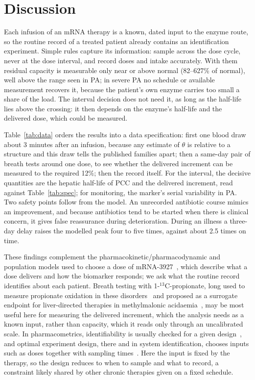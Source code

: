 \documentclass[11pt]{article}
\begin{document}
\section*{Discussion}

Each infusion of an mRNA therapy is a known, dated input to the enzyme route, so the routine
record of a treated patient already contains an identification experiment. Simple rules capture its information: sample across the dose
cycle, never at the dose interval, and record doses and intake accurately. With them residual
capacity is measurable only near or above normal (82--627\% of normal), well above the range seen
in PA; in severe PA no schedule or available measurement recovers it, because the patient's own
enzyme carries too small a share of the load. The interval decision does not need it, as long as
the half-life lies above the crossing: it then depends on the enzyme's half-life and the delivered
dose, which could be measured.

Table~\ref{tab:data} orders the results into a data specification: first one blood draw about 3
minutes after an infusion, because any estimate of $\theta$ is relative to a structure and this
draw tells the published families apart; then a same-day pair of breath tests around one dose, to
see whether the delivered increment can be measured to the required 12\%; then the record itself.
For the interval, the decisive quantities are the hepatic half-life of PCC and the delivered
increment, read against Table~\ref{tab:spec}; for monitoring, the marker's serial variability in
PA. Two safety points follow from the model. An unrecorded antibiotic course mimics an improvement, and because antibiotics tend to be started when there is clinical concern, it gives false reassurance during deterioration. During an illness a three-day delay raises the modelled peak
four to five times, against about 2.5 times on time.

These findings complement the pharmacokinetic/pharmacodynamic and population models used to
choose a dose of mRNA-3927~\cite{pkpd_translational,gao2025acop}, which describe what a dose
delivers and how the biomarker responds; we ask what the routine record identifies about each
patient. Breath testing with 1-$^{13}$C-propionate, long used to measure propionate oxidation in
these disorders~\cite{breath_test_original} and proposed as a surrogate endpoint for
liver-directed therapies in methylmalonic acidaemia~\cite{breath_test_mma}, may be most useful
here for measuring the delivered increment, which the analysis needs as a known input, rather than capacity, which it reads
only through an uncalibrated scale. In pharmacometrics, identifiability is usually checked for a
given design~\cite{nlme_identifiability,pd_identifiability}, and optimal experiment design, there
and in system identification, chooses inputs such as doses together with sampling
times~\cite{design_dose_and_times,qualitative_design,optimal_input}. Here the input is fixed by the
therapy, so the design reduces to when to sample and what to record, a constraint likely shared by
other chronic therapies given on a fixed schedule.
\end{document}
